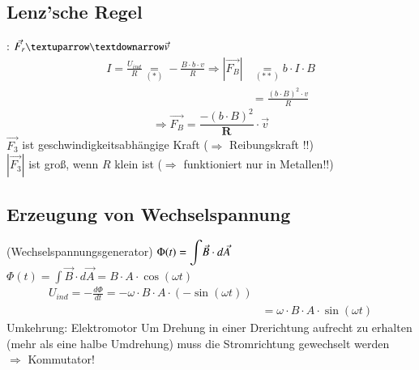 	\subsection{Lenz'sche Regel}: $ \vec{F_r}{\small \textuparrow\textdownarrow }\vec{v} $\\
	\begin{align*}
	I = \frac{U_{ind}}{R} \underset{(*)}{=} -\frac{B\cdot b\cdot v}{R} \Rightarrow |\vec{F_B}| &\underset{(**)}{=} b \cdot I \cdot B\\ &= \frac{(b\cdot B)^2 \cdot v}{R}
	\end{align*}
	$$ \Rightarrow \boxed{\vec{F_B} = \frac{-(b\cdot B)^2}{\textbf{R}} \cdot\vec{v}} $$
	$ \vec{F_3} $ ist geschwindigkeitsabhängige Kraft ($ \Rightarrow $ Reibungskraft !!)\\
	$ |\vec{F_3}| $ ist groß, wenn $ R $ klein ist ($ \Rightarrow $ funktioniert nur in Metallen!!)\\
	
	\subsection{Erzeugung von Wechselspannung} (Wechselspannungsgenerator)
	\bild
	$ \Phi(t) = {\displaystyle \int}\vec{B}\cdot d\vec{A} $
	\bild
	$ \Phi(t) = \int\vec{B}\cdot d\vec{A} = B \cdot A \cdot \cos(\omega t)$ \\
	\begin{align*}
	U_{ind} = -\frac{d\Phi}{dt} = - \omega \cdot B \cdot A \cdot (-\sin(\omega t))\\
	&= \omega \cdot B \cdot A \cdot \sin(\omega t)
	\end{align*}
	\bild
	Umkehrung: Elektromotor
	\bild
	Um Drehung in einer Drerichtung aufrecht zu erhalten (mehr als eine halbe Umdrehung) muss die Stromrichtung gewechselt werden\\
	$ \Rightarrow $ Kommutator!